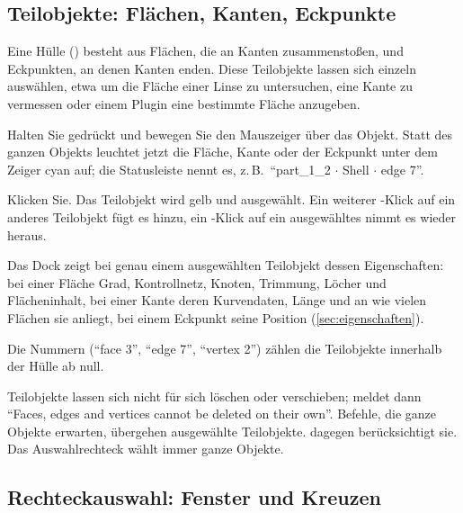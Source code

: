 \subsection{Teilobjekte: Flächen, Kanten, Eckpunkte}\label{sec:teilobjekte}

Eine Hülle () besteht aus Flächen, die an Kanten zusammenstoßen, und Eckpunkten,
an denen Kanten enden. Diese Teilobjekte lassen sich einzeln auswählen, etwa um die Fläche
einer Linse zu untersuchen, eine Kante zu vermessen oder einem Plugin eine bestimmte Fläche
anzugeben.

\begin{schritte}
  \item Halten Sie  gedrückt und bewegen Sie den Mauszeiger über das Objekt.
    Statt des ganzen Objekts leuchtet jetzt die Fläche, Kante oder der Eckpunkt unter dem
    Zeiger cyan auf; die Statusleiste nennt es, z.\,B.\ \enquote{part\_1\_2 $\cdot$ Shell
    $\cdot$ edge 7}.
  \item Klicken Sie. Das Teilobjekt wird gelb und ausgewählt. Ein weiterer
    -Klick auf ein anderes Teilobjekt fügt es hinzu, ein
    -Klick auf ein ausgewähltes nimmt es wieder heraus.
  \item Das Dock  zeigt bei genau einem ausgewählten Teilobjekt dessen
    Eigenschaften: bei einer Fläche Grad, Kontrollnetz, Knoten, Trimmung, Löcher und
    Flächeninhalt, bei einer Kante deren Kurvendaten, Länge und an wie vielen Flächen sie
    anliegt, bei einem Eckpunkt seine Position (\autoref{sec:eigenschaften}).
\end{schritte}

Die Nummern (\enquote{face 3}, \enquote{edge 7}, \enquote{vertex 2}) zählen die Teilobjekte
innerhalb der Hülle ab null.

\begin{hinweis}
Teilobjekte lassen sich nicht für sich löschen oder verschieben;  meldet dann
\enquote{Faces, edges and vertices cannot be deleted on their own}. Befehle, die ganze Objekte
erwarten, übergehen ausgewählte Teilobjekte.  dagegen berücksichtigt sie.
Das Auswahlrechteck wählt immer ganze Objekte.
\end{hinweis}

\subsection{Rechteckauswahl: Fenster und Kreuzen}\label{sec:rechteckauswahl}

